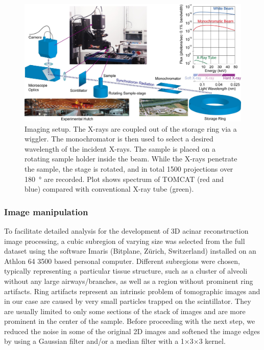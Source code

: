 \begin{figure}[htb]
	\centering
	\includegraphics[width=\imsize]{img/Tsuda2008/Tsuda-02}
	\caption{Imaging setup. The X-rays are coupled out of the storage ring via a wiggler. The monochromator is then used to select a desired wavelength of the incident
X-rays. The sample is placed on a rotating sample holder inside the beam. While the X-rays penetrate the sample, the stage is rotated, and in total 1500 projections over \SI{180}{\degree} are recorded. Plot shows spectrum of TOMCAT (red and blue) compared with conventional X-ray tube (green).}
	\label{fig:imaging setup}
\end{figure}

\subsubsection{Image manipulation}
To facilitate detailed analysis for the development of 3D acinar reconstruction image processing, a cubic subregion of varying size was selected from the full dataset using the software Imaris (Bitplane, Zürich, Switzerland) installed on an Athlon 64 3500 based personal computer. Different subregions were chosen, typically representing a particular tissue structure, such as a cluster of alveoli without any large airways/branches, as well as a region without prominent ring artifacts. Ring artifacts represent an intrinsic problem of tomographic images and in our case are caused by very small particles trapped on the scintillator. They are usually limited to only some sections of the stack of images and are more prominent in the center of the sample. Before proceeding with the next step, we reduced the noise in some of the original 2D images and softened the image edges by using a Gaussian filter and/or a median filter with a 1$\times$3$\times$3 kernel.


